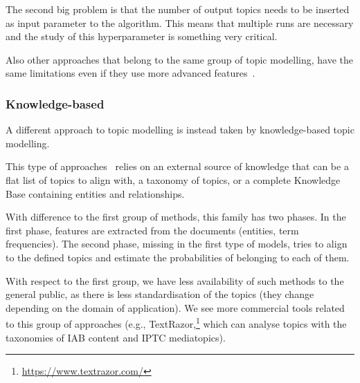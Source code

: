 
The second big problem is that the number of output topics needs to be inserted as input parameter to the algorithm. This means that multiple runs are necessary and the study of this hyperparameter is something very critical.

Also other approaches that belong to the same group of topic modelling, have the same limitations even if they use more advanced features~\citep{wang2012nonnegative,landauer1998introduction,grootendorst2022bertopic}.


\subsubsection{Knowledge-based}

A different approach to topic modelling is instead taken by knowledge-based topic modelling.

This type of approaches~\citep{chen2013leveraging,allahyari2017knowledge,xu2018hierarchical,ali2019transportation} relies on an external source of knowledge that can be a flat list of topics to align with, a taxonomy of topics, or a complete Knowledge Base containing entities and relationships.

With difference to the first group of methods, this family has two phases.
In the first phase, features are extracted from the documents (entities, term frequencies).
The second phase, missing in the first type of models, tries to align to the defined topics and estimate the probabilities of belonging to each of them.

With respect to the first group, we have less availability of such methods to the general public, as there is less standardisation of the topics (they change depending on the domain of application).
We see more commercial tools related to this group of approaches (e.g., TextRazor,\footnote{\url{https://www.textrazor.com/}} which can analyse topics with the taxonomies of IAB content and IPTC mediatopics).




